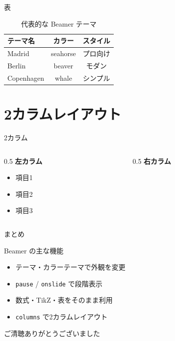 \documentclass[lualatex, unicode]{beamer}
\begin{document}
\begin{frame}{表}
  \begin{table}
    \centering
    \begin{tabular}{lcc}
      \hline
      テーマ名    & カラー   & スタイル \\
      \hline
      Madrid      & seahorse & プロ向け \\
      Berlin      & beaver   & モダン \\
      Copenhagen  & whale    & シンプル \\
      \hline
    \end{tabular}
    \caption{代表的な Beamer テーマ}
  \end{table}
\end{frame}

\section{2カラムレイアウト}

\begin{frame}{2カラム}
  \begin{columns}
    \begin{column}{0.5\linewidth}
      \textbf{左カラム}
      \begin{itemize}
        \item 項目1
        \item 項目2
        \item 項目3
      \end{itemize}
    \end{column}
    \begin{column}{0.5\linewidth}
      \textbf{右カラム}
    \end{column}
  \end{columns}
\end{frame}

\begin{frame}{まとめ}
  \begin{block}{Beamer の主な機能}
    \begin{itemize}
      \item テーマ・カラーテーマで外観を変更
      \item \texttt{pause} / \texttt{onslide} で段階表示
      \item 数式・TikZ・表をそのまま利用
      \item \texttt{columns} で2カラムレイアウト
    \end{itemize}
  \end{block}

  \vspace{1em}
  \centering
  \Large ご清聴ありがとうございました
\end{frame}
\end{document}
